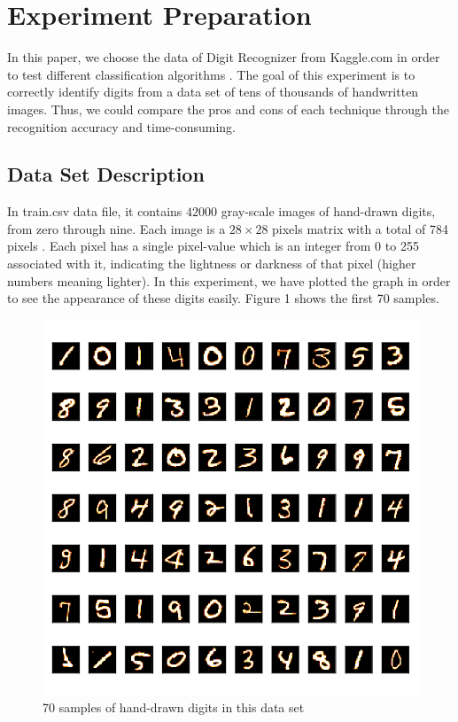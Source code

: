 \documentclass[sigconf]{acmart}
\begin{document}
\section{Experiment Preparation}

In this paper, we choose the data of Digit Recognizer from Kaggle.com in order to test different classification algorithms \cite{kaggle}. The goal of this experiment is to correctly identify digits from a data set of tens of thousands of handwritten images. Thus, we could compare the pros and cons of each technique through the recognition accuracy and time-consuming.

\subsection{Data Set Description}

In train.csv data file, it contains $42000$ gray-scale images of hand-drawn digits, from zero through nine. Each image is a $28 \times 28$ pixels matrix with a total of 784 pixels \cite{kaggle}. Each pixel has a single pixel-value which is an integer from 0 to 255 associated with it, indicating the lightness or darkness of that pixel (higher numbers meaning lighter). In this experiment, we have plotted the graph in order to see the appearance of these digits easily. Figure 1 shows the first 70 samples.
\begin{figure}[!ht]
\centering
\includegraphics[width=\columnwidth]{images/data_samples}
\caption{70 samples of hand-drawn digits in this data set}
\end{figure}
\end{document}
